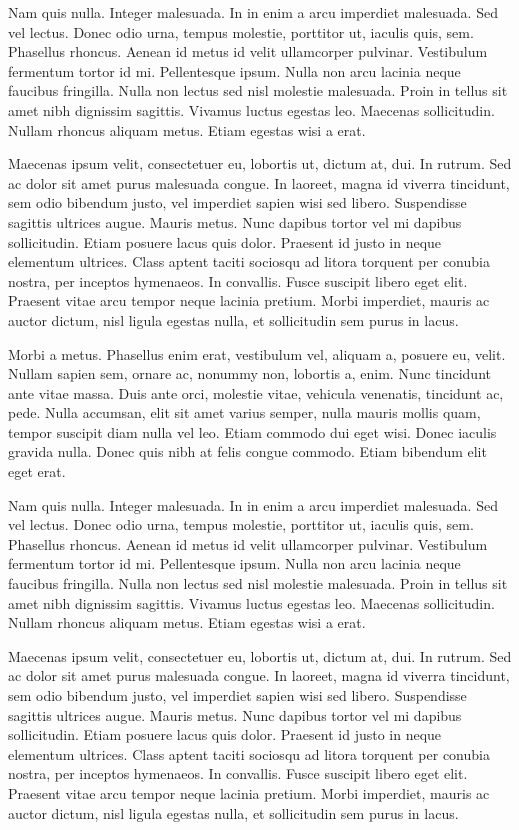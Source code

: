 Nam quis nulla. Integer malesuada. In in enim a arcu imperdiet malesuada. Sed vel lectus. Donec odio urna, tempus molestie, porttitor ut, iaculis quis, sem. Phasellus rhoncus. Aenean id metus id velit ullamcorper pulvinar. Vestibulum fermentum tortor id mi. Pellentesque ipsum. Nulla non arcu lacinia neque faucibus fringilla. Nulla non lectus sed nisl molestie malesuada. Proin in tellus sit amet nibh dignissim sagittis. Vivamus luctus egestas leo. Maecenas sollicitudin. Nullam rhoncus aliquam metus. Etiam egestas wisi a erat.

Maecenas ipsum velit, consectetuer eu, lobortis ut, dictum at, dui. In rutrum. Sed ac dolor sit amet purus malesuada congue. In laoreet, magna id viverra tincidunt, sem odio bibendum justo, vel imperdiet sapien wisi sed libero. Suspendisse sagittis ultrices augue. Mauris metus. Nunc dapibus tortor vel mi dapibus sollicitudin. Etiam posuere lacus quis dolor. Praesent id justo in neque elementum ultrices. Class aptent taciti sociosqu ad litora torquent per conubia nostra, per inceptos hymenaeos. In convallis. Fusce suscipit libero eget elit. Praesent vitae arcu tempor neque lacinia pretium. Morbi imperdiet, mauris ac auctor dictum, nisl ligula egestas nulla, et sollicitudin sem purus in lacus.

Morbi a metus. Phasellus enim erat, vestibulum vel, aliquam a, posuere eu, velit. Nullam sapien sem, ornare ac, nonummy non, lobortis a, enim. Nunc tincidunt ante vitae massa. Duis ante orci, molestie vitae, vehicula venenatis, tincidunt ac, pede. Nulla accumsan, elit sit amet varius semper, nulla mauris mollis quam, tempor suscipit diam nulla vel leo. Etiam commodo dui eget wisi. Donec iaculis gravida nulla. Donec quis nibh at felis congue commodo. Etiam bibendum elit eget erat.

Nam quis nulla. Integer malesuada. In in enim a arcu imperdiet malesuada. Sed vel lectus. Donec odio urna, tempus molestie, porttitor ut, iaculis quis, sem. Phasellus rhoncus. Aenean id metus id velit ullamcorper pulvinar. Vestibulum fermentum tortor id mi. Pellentesque ipsum. Nulla non arcu lacinia neque faucibus fringilla. Nulla non lectus sed nisl molestie malesuada. Proin in tellus sit amet nibh dignissim sagittis. Vivamus luctus egestas leo. Maecenas sollicitudin. Nullam rhoncus aliquam metus. Etiam egestas wisi a erat.

Maecenas ipsum velit, consectetuer eu, lobortis ut, dictum at, dui. In rutrum. Sed ac dolor sit amet purus malesuada congue. In laoreet, magna id viverra tincidunt, sem odio bibendum justo, vel imperdiet sapien wisi sed libero. Suspendisse sagittis ultrices augue. Mauris metus. Nunc dapibus tortor vel mi dapibus sollicitudin. Etiam posuere lacus quis dolor. Praesent id justo in neque elementum ultrices. Class aptent taciti sociosqu ad litora torquent per conubia nostra, per inceptos hymenaeos. In convallis. Fusce suscipit libero eget elit. Praesent vitae arcu tempor neque lacinia pretium. Morbi imperdiet, mauris ac auctor dictum, nisl ligula egestas nulla, et sollicitudin sem purus in lacus.


